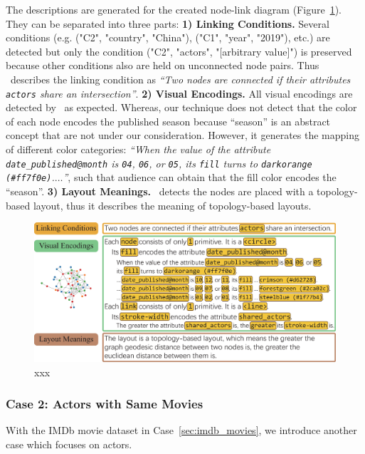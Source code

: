 The descriptions are generated for the created node-link diagram (Figure~\ref{fig:iMDBMovies}).
They can be separated into three parts:
\textbf{1) Linking Conditions.} Several conditions (e.g. ("C2", "country", "China"), ("C1", "year", "2019"), etc.) are detected but only the condition ("C2", "actors", "[arbitrary value]") is preserved because other conditions also are held on unconnected node pairs.
Thus \ApproachName~describes the linking condition as \textit{``Two nodes are connected if their attributes {\texttt{actors}} share an intersection''}.
\textbf{2) Visual Encodings.} All visual encodings are detected by \ApproachName~as expected.
Whereas, our technique does not detect that the color of each node encodes the published season because ``season'' is an abstract concept that are not under our consideration.
However, it generates the mapping of different color categories: \textit{``When the value of the attribute {\texttt{date\_published@month}} is {\texttt{04}}, {\texttt{06}}, or {\texttt{05}}, 
its {\texttt{fill}} turns to {\texttt{darkorange (\#ff7f0e)}}.$\ldots$''}, 
such that audience can obtain that the fill color encodes the ``season''.
\textbf{3) Layout Meanings.} \ApproachName~detects the nodes are placed with a topology-based layout, thus it describes the meaning of topology-based
layouts.

\begin{figure}
    \centering
    \includegraphics[width=1\columnwidth]{figures/iMDBMovies.eps}
    \caption{xxx}
    \label{fig:iMDBMovies}
\end{figure}


\subsubsection{Case 2: Actors with Same Movies}
With the IMDb movie dataset in Case~\ref{sec:imdb_movies}, we introduce another case which focuses on actors.

